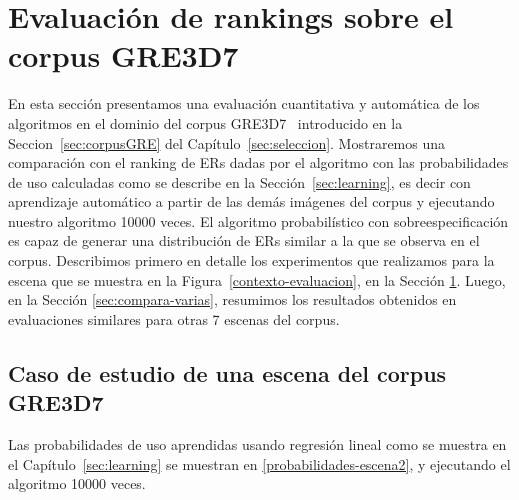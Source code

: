 \section{Evaluaci\'on de rankings sobre el corpus GRE3D7}
\label{sec:compara}
En esta secci\'on presentamos una evaluaci\'on cuantitativa y autom\'atica de los algoritmos en el dominio del corpus GRE3D7~\cite{gre3d7} introducido en la Seccion~\ref{sec:corpusGRE} del Cap\'itulo~\ref{sec:seleccion}. Mostraremos una comparaci\'on con el ranking de ERs dadas por el algoritmo con las probabilidades de uso calculadas como se describe en la Secci\'on~\ref{sec:learning}, es decir con aprendizaje autom\'atico a partir de las dem\'as im\'agenes del corpus y ejecutando nuestro algoritmo 10000 veces. El algoritmo probabil\'istico con sobreespecificaci\'on es capaz de generar una distribuci\'on de ERs similar a la que se observa en el corpus. Describimos primero en detalle los experimentos que realizamos para la escena que se muestra en la Figura~\ref{contexto-evaluacion}, en la Secci\'on \ref{sec:compara}. Luego, en la Secci\'on \ref{sec:compara-varias}, resumimos los resultados obtenidos en evaluaciones similares para otras 7 escenas del corpus. 
\subsection{Caso de estudio de una escena del corpus GRE3D7}

Las probabilidades de uso aprendidas usando regresi\'on lineal como se muestra en el Cap\'itulo~\ref{sec:learning} se muestran en \ref{probabilidades-escena2}, y ejecutando el algoritmo 10000 veces.

